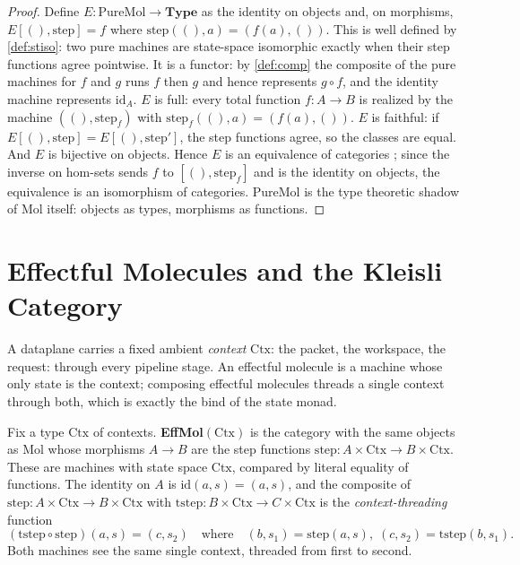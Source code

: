 \begin{proof}
Define $E : \mathrm{PureMol} \to \mathbf{Type}$ as the identity on objects
and, on morphisms,
$E[(), \mathrm{step}] = f$ where $\mathrm{step} ((), a) = (f (a), ())$. This is
well defined by \autoref{def:stiso}: two pure machines are state-space
isomorphic exactly when their step functions agree pointwise. It is a
functor: by \autoref{def:comp} the composite of the pure machines for $f$ and
$g$ runs $f$ then $g$ and hence represents $g \circ f$, and the identity
machine represents $\mathrm{id}_A$. $E$ is full: every total function
$f : A \to B$ is realized by the machine $((), \mathrm{step}_f)$ with
$\mathrm{step}_f ((), a) = (f (a), ())$. $E$ is faithful: if
$E[(), \mathrm{step}] = E[(), \mathrm{step}']$, the step functions agree, so
the classes are equal. And $E$ is bijective on objects. Hence $E$ is an
equivalence of categories \citep{maclane}; since the inverse on hom-sets
sends $f$ to $[(), \mathrm{step}_f]$ and is the identity on objects, the
equivalence is an isomorphism of categories. PureMol is the type
theoretic shadow of Mol itself: objects as types, morphisms as functions.
\end{proof}

\section{Effectful Molecules and the Kleisli Category}\label{sec:mol-eff}

A dataplane carries a fixed ambient \emph{context} $\mathrm{Ctx}$: the
packet, the workspace, the request: through every pipeline stage. An
effectful molecule is a machine whose only state is the context; composing
effectful molecules threads a single context through both, which is exactly
the bind of the state monad.

\begin{definition}[EffMol]\label{def:effmol}
Fix a type $\mathrm{Ctx}$ of contexts. \textbf{EffMol}$(\mathrm{Ctx})$ is the
category with the same objects as Mol whose morphisms $A \to B$ are the step
functions $\mathrm{step} : A \times \mathrm{Ctx} \to B \times \mathrm{Ctx}$.
These are machines with state space $\mathrm{Ctx}$, compared by literal equality
of functions. The identity on $A$ is $\mathrm{id} (a, s) = (a, s)$, and the
composite of $\mathrm{step} : A \times \mathrm{Ctx} \to B \times \mathrm{Ctx}$
with $\mathrm{tstep} : B \times \mathrm{Ctx} \to C \times \mathrm{Ctx}$ is the
\emph{context-threading} function
\[ (\mathrm{tstep} \circ \mathrm{step})(a, s) = (c, s_2)
   \quad\text{where}\quad (b, s_1) = \mathrm{step} (a, s),\; (c, s_2)
   = \mathrm{tstep} (b, s_1) . \]
Both machines see the same single context, threaded from first to second.
\end{definition}

